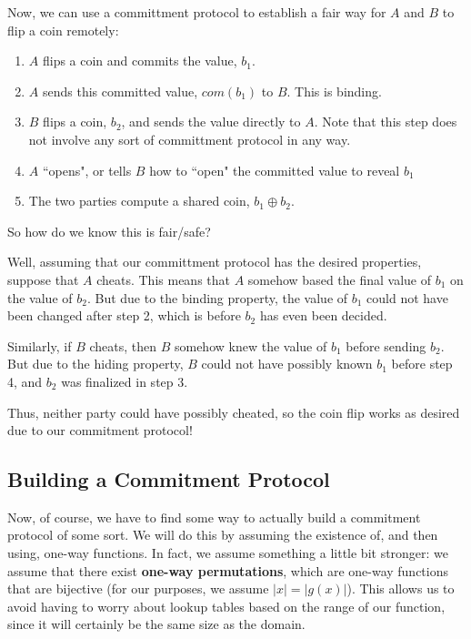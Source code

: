 \documentclass[11pt]{article}
\begin{document}
Now, we can use a committment protocol to establish a fair way for \(A\) and \(B\) to flip a coin remotely:

\begin{enumerate}
\item \(A\) flips a coin and commits the value, \(b_1\).
\item \(A\) sends this committed value, \(com(b_1)\) to \(B\). This is binding.
\item \(B\) flips a coin, \(b_2\), and sends the value directly to \(A\). Note that this step does not involve any sort of committment protocol in any way.
\item \(A\) ``opens", or tells \(B\) how to ``open" the committed value to reveal \(b_1\)
\item The two parties compute a shared coin, \(b_1\oplus b_2\).
\end{enumerate}

\newpage
So how do we know this is fair/safe? 

Well, assuming that our committment protocol has the desired properties, suppose that \(A\) cheats. This means that \(A\) somehow based the final value of \(b_1\) on the value of \(b_2\). But due to the binding property, the value of \(b_1\) could not have been changed after step 2, which is before \(b_2\) has even been decided. 

Similarly, if \(B\) cheats, then \(B\) somehow knew the value of \(b_1\) before sending \(b_2\). But due to the hiding property, \(B\) could not have possibly known \(b_1\) before step 4, and \(b_2\) was finalized in step 3. 

Thus, neither party could have possibly cheated, so the coin flip works as desired due to our commitment protocol!


\subsection{Building a Commitment Protocol}

Now, of course, we have to find some way to actually build a commitment protocol of some sort. We will do this by assuming the existence of, and then using, one-way functions. In fact, we assume something a little bit stronger: we assume that there exist \textbf{one-way permutations}, which are one-way functions that are bijective (for our purposes, we assume \(|x|=|g(x)|\)). This allows us to avoid having to worry about lookup tables based on the range of our function, since it will certainly be the same size as the domain. \smallskip
\end{document}
